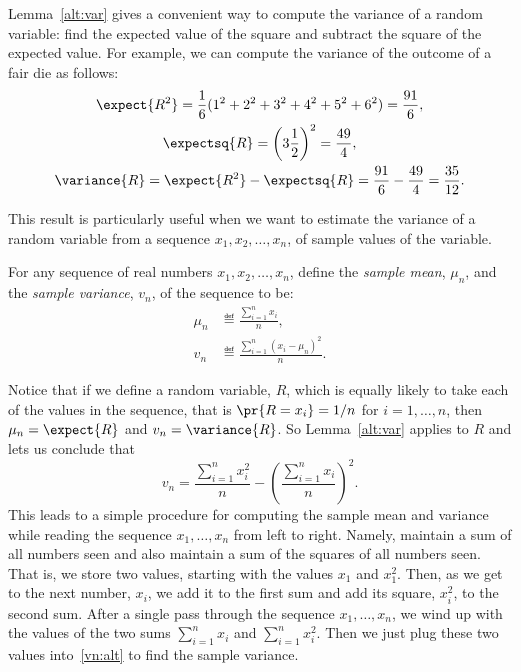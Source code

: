 \begin{editingnotes}

Lemma~\ref{alt:var} gives a convenient way to compute the variance of a
random variable: find the expected value of the square and subtract the
square of the expected value.  For example, we can compute the variance of
the outcome of a fair die as follows:
\begin{gather*}
  \expect{R^2} = \frac{1}{6} (1^2 + 2^2 + 3^2 + 4^2 + 5^2 + 6^2) = \frac{91}{6}, \\
  \expectsq{R} = \left(3 \frac{1}{2}\right)^2 = \frac{49}{4}, \\
  \variance{R}  = \expect{R^2} - \expectsq{R}
  = \frac{91}{6} - \frac{49}{4} = \frac{35}{12}.
\end{gather*}

This result is particularly useful when we want to estimate the variance
of a random variable from a sequence $x_1,x_2,\dots,x_n$, of sample values
of the variable.

\begin{definition*}
For any sequence of real numbers $x_1,x_2,\dots,x_n$, define the
\emph{sample mean}, $\mu_n$, and the \emph{sample variance}, $v_n$, of the
sequence to be:
\begin{align*}
    \mu_n   & \eqdef \frac{\sum_{i=1}^n x_i}{n},\\
    v_n     & \eqdef \frac{\sum_{i=1}^n (x_i - \mu_n)^2}{n}.
\end{align*}
\end{definition*}
Notice that if we define a random variable, $R$, which is equally likely
to take each of the values in the sequence, that is $\pr{R = x_i} = 1/n$
for $i = 1,\dots,n$, then $\mu_n = \expect{R}$ and $v_n = \variance{R}$.
So Lemma~\ref{alt:var} applies to $R$ and lets us conclude that
\begin{equation}\label{vn:alt}
v_n = \frac{\sum_{i=1}^n x_i^2}{n} - \left(\frac{\sum_{i=1}^n x_i}{n}\right)^2.
\end{equation}
This leads to a simple procedure for computing the sample mean and
variance while reading the sequence $x_1,\dots,x_n$ from left to right.
Namely, maintain a sum of all numbers seen and also maintain a sum of the
squares of all numbers seen.  That is, we store two values, starting with
the values $x_1$ and $x_1^2$.  Then, as we get to the next number, $x_i$,
we add it to the first sum and add its square, $x_{i}^2$, to the second
sum.  After a single pass through the sequence $x_1,\dots,x_n$, we wind up
with the values of the two sums $\sum_{i=1}^n x_i$ and $\sum_{i=1}^n
x_i^2$.  Then we just plug these two values into~\eqref{vn:alt} to find
the sample variance.

\end{editingnotes}

